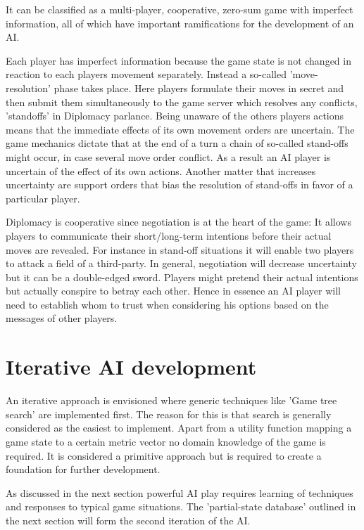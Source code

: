 \documentclass[12pt]{article}
\begin{document}
It can be classified as a multi-player, cooperative, zero-sum game
with imperfect information, all of which have important ramifications
for the development of an AI.

Each player has imperfect information because the game state is not
changed in reaction to each players movement separately. Instead a 
so-called 'move-resolution' phase takes place. Here players formulate
their moves in secret and then submit them simultaneously to the game
server which resolves any conflicts, 'standoffs'
in Diplomacy parlance. Being unaware of the others players actions means
that the immediate effects of its own movement orders are uncertain. The
game mechanics dictate that at the end of a turn a chain of so-called 
stand-offs might occur, in case several move order conflict. As a result
an AI player is uncertain of the effect of its own actions. Another matter
that increases uncertainty are support orders that bias the resolution of
stand-offs in favor of a particular player. 

Diplomacy is cooperative since negotiation is at the heart of the game:
It allows players to communicate their short/long-term intentions before
their actual moves are revealed. For instance in stand-off situations it will
enable two players to attack a field of a third-party. In general, negotiation
will decrease uncertainty but it can be a double-edged sword. Players might
pretend their actual intentions but actually conspire to betray each other. Hence
in essence an AI player will need to establish whom to trust when considering
his options based on the messages of other players.


\section{Iterative AI development}

An iterative approach is envisioned where generic techniques
like 'Game tree search' are implemented first. The reason for this is that 
search is generally considered as the easiest to implement. Apart from
a utility function mapping a game state to a certain metric vector no 
domain knowledge of the game is required. It is considered a primitive
approach but is required to create a foundation for further development.

As discussed in the next section powerful AI play requires learning of
techniques and responses to typical game situations. The 'partial-state
database' outlined in the next section will form the second iteration
of the AI. 
\end{document}
